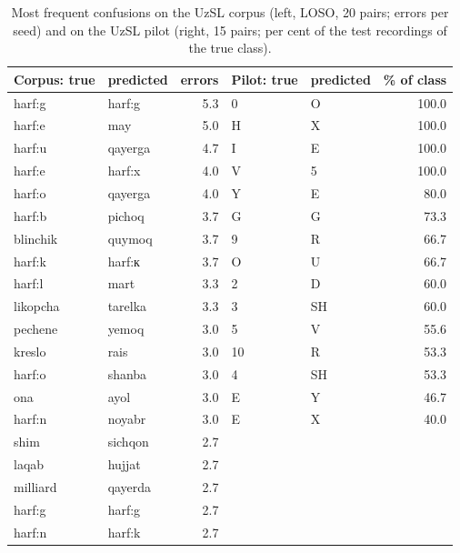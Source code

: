 \documentclass[a4paper,10pt]{article}
\newcommand{\ruT}[1]{{\fontencoding{T2A}\selectfont #1}}
\begin{document}
\begin{table}[H]
\caption{Most frequent confusions on the UzSL corpus (left, LOSO, 20 pairs; errors per seed) and on the UzSL pilot (right, 15 pairs; per cent of the test recordings of the true class).}\label{tab:s_conf2}
\centering
\scriptsize
\begin{tabular}{llr|llr}
\toprule
\textbf{Corpus: true} & \textbf{predicted} & \textbf{errors} & \textbf{Pilot: true} & \textbf{predicted} & \textbf{\% of class} \\
\midrule
harf:g\textquotesingle{} & harf:g & 5.3 & 0 & O & 100.0 \\
harf:e & may & 5.0 & H & X & 100.0 \\
harf:u & qayerga & 4.7 & I & E & 100.0 \\
harf:e & harf:x & 4.0 & V & 5 & 100.0 \\
harf:o\textquotesingle{} & qayerga & 4.0 & Y & E & 80.0 \\
harf:b & pichoq & 3.7 & G\textquotesingle{} & G & 73.3 \\
blinchik & quymoq & 3.7 & 9 & R & 66.7 \\
harf:k & \ruT{harf:к} & 3.7 & O\textquotesingle{} & U & 66.7 \\
harf:l & mart & 3.3 & 2 & D & 60.0 \\
likopcha & tarelka & 3.3 & 3 & SH & 60.0 \\
pechene & yemoq & 3.0 & 5 & V & 55.6 \\
kreslo & rais & 3.0 & 10 & R & 53.3 \\
harf:o\textquotesingle{} & shanba & 3.0 & 4 & SH & 53.3 \\
ona & ayol & 3.0 & E & Y & 46.7 \\
harf:n & noyabr & 3.0 & E & X & 40.0 \\
shim & sichqon & 2.7 &  &  &  \\
laqab & hujjat & 2.7 &  &  &  \\
milliard & qayerda & 2.7 &  &  &  \\
harf:g & harf:g\textquotesingle{} & 2.7 &  &  &  \\
harf:n & harf:k & 2.7 &  &  &  \\
\bottomrule
\end{tabular}
\end{table}
\end{document}
